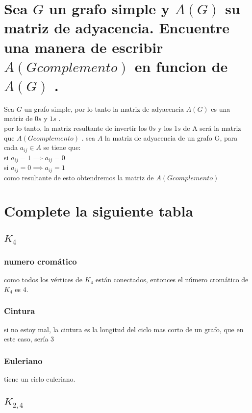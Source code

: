 \documentclass[10pt,a4paper]{article} %
\begin{document}
            \section{Sea $ G  $  un grafo simple y $ A(G)  $ su matriz de
            adyacencia. Encuentre una manera de escribir $ A(Gcomplemento)  $
            en funcion de $ A(G)  $ . }
            Sea $ G  $  un grafo simple, por lo tanto la matriz de adyacencia $
            A(G)  $ es una matriz de $ 0s  $ y $ 1s  $ .
            \\ por lo tanto, la matriz resultante de invertir los $ 0s  $ y los
            $ 1s  $ de A será la matriz que $ A(Gcomplemento)  $ .
            sea $ A  $ la matriz de adyacencia de un grafo G, para cada $ a_{ij} \in A $ se tiene que:
            \\ si $ a_{ij} = 1 \implies a_{ij} = 0 $
            \\ si $ a_{ij} = 0 \implies a_{ij} = 1  $
            \\ como resultante de esto obtendremos la matriz de $ A(Gcomplemento)  $

            \section{Complete la siguiente tabla}
                \subsection{$ K_4  $ }
                    \subsubsection{numero cromático}
                        como todos los vértices de $ K_4 $ están conectados,
                        entonces el número cromático de $ K_4  $ es 4.
                    \subsubsection{Cintura}
                        si no estoy mal, la cintura es la longitud del ciclo
                        mas corto de un grafo, que en este caso, sería 3
                    \subsubsection{Euleriano}
                        tiene un ciclo euleriano.
                \subsection{$ K_{2,4}  $ }
\end{document}

